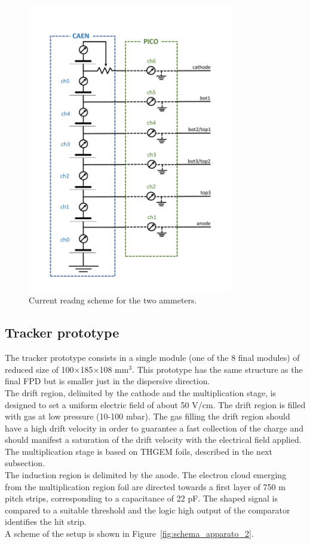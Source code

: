 \documentclass[a4paper, 11 pt]{article}
\begin{document}
\begin{figure}
	\centering
	\includegraphics[width=0.8\textwidth]{Immagini/schema_canali.pdf}
	\caption{Current readng scheme for the two ammeters.}
	\label{fig:schema_canali}
\end{figure}


\subsection{Tracker prototype}

The tracker prototype consists in a single module (one of the 8 final modules) of reduced size of 100$\times$185$\times$108 mm$^{3}$. This prototype has the same structure as the final FPD but is smaller just in the dispersive direction.\\
The drift region, delimited by the cathode and the multiplication stage, is designed to set a uniform electric field of about 50 V/cm. The drift region is filled with gas at low pressure (10-100 mbar). The gas filling the drift region should have a high drift velocity in order to guarantee a fast collection of the charge and should manifest a saturation of the drift velocity with the electrical field applied.\\
The multiplication stage is based on THGEM foils, described in the next subsection.\\
The induction region is delimited by the anode. The electron cloud emerging from the multiplication region foil are directed towards a first layer of 750 m pitch strips, corresponding to a capacitance of 22 pF. The shaped signal is compared to a suitable threshold and the logic high output of the comparator identifies the hit strip.\\
A scheme of the setup is shown in Figure~\ref{fig:schema_apparato_2}.\\
\end{document}

